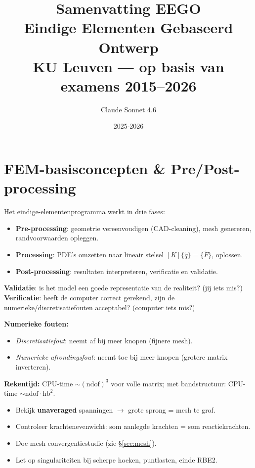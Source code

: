 \documentclass[a4paper,10pt]{article}
\title{\textbf{Samenvatting EEGO}\\
  \large Eindige Elementen Gebaseerd Ontwerp\\
  \small KU Leuven --- op basis van examens 2015--2026}
\author{Claude Sonnet 4.6}
\date{2025-2026}
\begin{document}
\maketitle
\tableofcontents
\newpage

\section{FEM-basisconcepten \& Pre/Post-processing}

Het eindige-elementenprogramma werkt in drie fases:
\begin{itemize}
  \item \textbf{Pre-processing}: geometrie vereenvoudigen (CAD-cleaning), mesh genereren, randvoorwaarden opleggen.
  \item \textbf{Processing}: PDE's omzetten naar lineair stelsel $[K]\{\tilde{q}\} = \{\tilde{F}\}$, oplossen.
  \item \textbf{Post-processing}: resultaten interpreteren, verificatie en validatie.
\end{itemize}

\begin{exambox}
\textbf{Validatie}: is het model een goede representatie van de realiteit? (jij iets mis?)\\
\textbf{Verificatie}: heeft de computer correct gerekend, zijn de numerieke/discretisatiefouten acceptabel? (computer iets mis?)
\end{exambox}

\textbf{Numerieke fouten:}
\begin{itemize}
  \item \textit{Discretisatiefout}: neemt af bij meer knopen (fijnere mesh).
  \item \textit{Numerieke afrondingsfout}: neemt toe bij meer knopen (grotere matrix inverteren).
\end{itemize}

\textbf{Rekentijd:} CPU-time $\sim (\text{ndof})^3$ voor volle matrix; met bandstructuur: CPU-time $\sim \text{ndof} \cdot \text{hb}^2$.

\begin{formulebox}
\begin{itemize}
  \item Bekijk \textbf{unaveraged} spanningen $\to$ grote sprong = mesh te grof.
  \item Controleer krachtenevenwicht: som aanlegde krachten = som reactiekrachten.
  \item Doe mesh-convergentiestudie (zie \S\ref{sec:mesh}).
  \item Let op singulariteiten bij scherpe hoeken, puntlasten, einde RBE2.
\end{itemize}
\end{formulebox}
\end{document}
